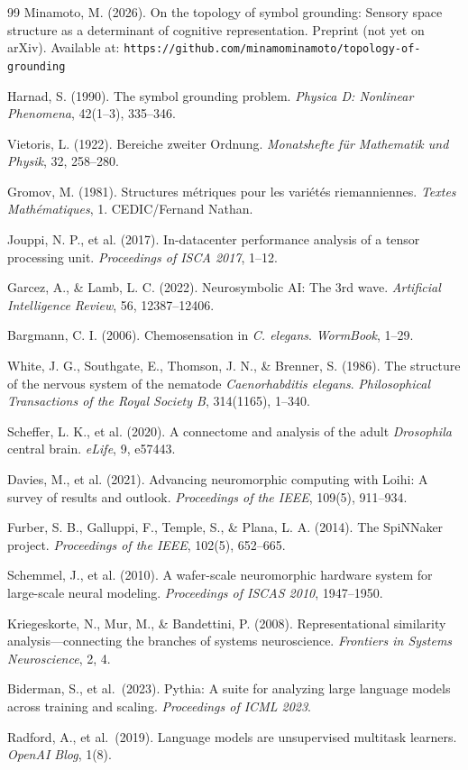 \documentclass[12pt]{article}
\begin{document}
\begin{thebibliography}{99}
Minamoto, M. (2026). On the topology of symbol grounding: Sensory space
structure as a determinant of cognitive representation.
Preprint (not yet on arXiv). Available at:
\texttt{https://github.com/minamominamoto/topology-of-grounding}

Harnad, S. (1990). The symbol grounding problem. \textit{Physica D:
Nonlinear Phenomena}, 42(1--3), 335--346.

Vietoris, L. (1922). Bereiche zweiter Ordnung. \textit{Monatshefte
f\"{u}r Mathematik und Physik}, 32, 258--280.

Gromov, M. (1981). Structures m\'{e}triques pour les vari\'{e}t\'{e}s
riemanniennes. \textit{Textes Math\'{e}matiques}, 1. CEDIC/Fernand Nathan.

Jouppi, N. P., et al. (2017). In-datacenter performance analysis of a
tensor processing unit. \textit{Proceedings of ISCA 2017}, 1--12.

Garcez, A., \& Lamb, L. C. (2022). Neurosymbolic AI: The 3rd wave.
\textit{Artificial Intelligence Review}, 56, 12387--12406.

Bargmann, C. I. (2006). Chemosensation in \textit{C. elegans}.
\textit{WormBook}, 1--29.

White, J. G., Southgate, E., Thomson, J. N., \& Brenner, S. (1986).
The structure of the nervous system of the nematode
\textit{Caenorhabditis elegans}. \textit{Philosophical Transactions
of the Royal Society B}, 314(1165), 1--340.

Scheffer, L. K., et al. (2020). A connectome and analysis of the adult
\textit{Drosophila} central brain. \textit{eLife}, 9, e57443.

Davies, M., et al. (2021). Advancing neuromorphic computing with Loihi:
A survey of results and outlook. \textit{Proceedings of the IEEE},
109(5), 911--934.

Furber, S. B., Galluppi, F., Temple, S., \& Plana, L. A. (2014).
The SpiNNaker project. \textit{Proceedings of the IEEE}, 102(5), 652--665.

Schemmel, J., et al. (2010). A wafer-scale neuromorphic hardware system
for large-scale neural modeling. \textit{Proceedings of ISCAS 2010},
1947--1950.

Kriegeskorte, N., Mur, M., \& Bandettini, P. (2008). Representational
similarity analysis---connecting the branches of systems neuroscience.
\textit{Frontiers in Systems Neuroscience}, 2, 4.

Biderman, S., et al.\ (2023).
Pythia: A suite for analyzing large language models across training and scaling.
\textit{Proceedings of ICML 2023}.

Radford, A., et al.\ (2019).
Language models are unsupervised multitask learners.
\textit{OpenAI Blog}, 1(8).

\end{thebibliography}
\end{document}
